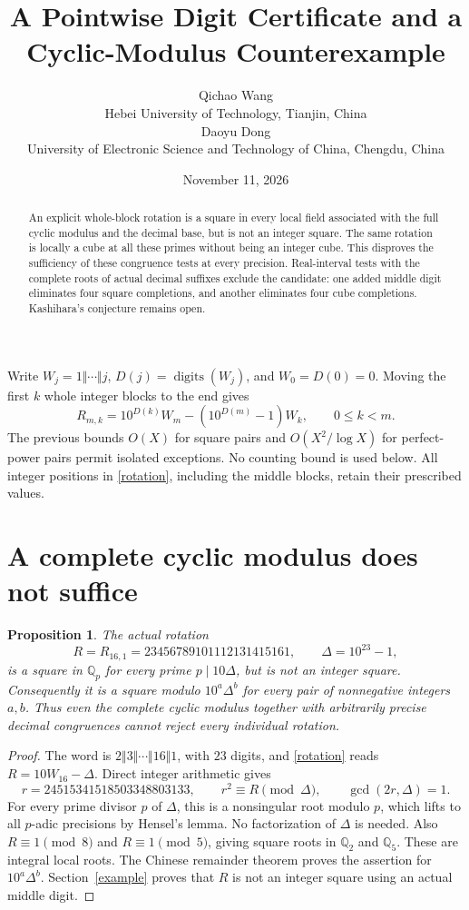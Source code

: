 \documentclass[9pt]{extarticle}
\title{A Pointwise Digit Certificate and a Cyclic-Modulus Counterexample}
\author{Qichao Wang\\{\small Hebei University of Technology, Tianjin, China}\\[0.4em]Daoyu Dong\\{\small University of Electronic Science and Technology of China, Chengdu, China}}
\date{November 11, 2026}
\newtheorem{proposition}[theorem]{Proposition}
\begin{document}
\maketitle
\begin{abstract}
An explicit whole-block rotation is a square in every local field
associated with the full cyclic modulus and the decimal base, but is
not an integer square. The same rotation is locally a cube at all these
primes without being an integer cube. This disproves the sufficiency of
these congruence tests at every precision. Real-interval tests with the
complete roots of actual decimal suffixes exclude the candidate: one
added middle digit eliminates four square completions, and another
eliminates four cube completions. Kashihara's conjecture remains open.
\end{abstract}
Write $W_j=1\Vert\cdots\Vert j$, $D(j)=\operatorname{digits}(W_j)$,
and $W_0=D(0)=0$. Moving the first $k$ whole integer blocks to the end gives
\begin{equation}\label{rotation}
 R_{m,k}=10^{D(k)}W_m-(10^{D(m)}-1)W_k,\qquad 0\le k<m.
\end{equation}
The previous bounds $O(X)$ for square pairs and $O(X^2/\log X)$ for
perfect-power pairs permit isolated exceptions. No counting bound is
used below. All integer positions in \eqref{rotation}, including the
middle blocks, retain their prescribed values.

\section{A complete cyclic modulus does not suffice}
\begin{proposition}\label{failure}
The actual rotation
\[
 R=R_{16,1}=23456789101112131415161,\qquad \Delta=10^{23}-1,
\]
is a square in $\mathbb Q_p$ for every prime $p\mid 10\Delta$, but is
not an integer square. Consequently it is a square modulo
$10^a\Delta^b$ for every pair of nonnegative integers $a,b$.
Thus even the complete cyclic modulus together with arbitrarily precise
decimal congruences cannot reject every individual rotation.
\end{proposition}
\begin{proof}
The word is $2\Vert3\Vert\cdots\Vert16\Vert1$, with $23$ digits,
and \eqref{rotation} reads $R=10W_{16}-\Delta$. Direct integer arithmetic gives
\[
 r=24515341518503348803133,\qquad r^2\equiv R\pmod\Delta,
 \qquad \gcd(2r,\Delta)=1.
\]
For every prime divisor $p$ of $\Delta$, this is a nonsingular root
modulo $p$, which lifts to all $p$-adic precisions by Hensel's lemma.
No factorization of $\Delta$ is needed. Also $R\equiv1\pmod8$ and
$R\equiv1\pmod5$, giving square roots in $\mathbb Q_2$ and
$\mathbb Q_5$. These are integral local roots. The Chinese remainder
theorem proves the assertion for $10^a\Delta^b$. Section~\ref{example}
proves that $R$ is not an integer square using an actual middle digit.
\end{proof}
\end{document}
